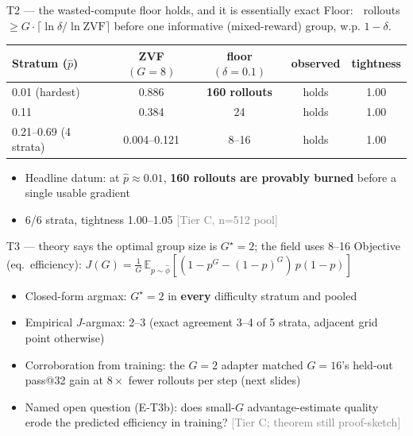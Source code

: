 \documentclass[aspectratio=169,11pt]{beamer}
\newcommand{\tier}[1]{\hfill{\scriptsize\textcolor{gray}{[#1]}}}
\begin{document}
\begin{frame}{T2 --- the wasted-compute floor holds, and it is essentially exact}
  Floor: $\;$ rollouts $\ge G\cdot\lceil \ln\delta / \ln \mathrm{ZVF} \rceil$
  before one informative (mixed-reward) group, w.p. $1-\delta$.
  \vspace{4pt}
  \centering
  \begin{tabular}{@{}lcccc@{}}
    \toprule
    Stratum ($\hat p$) & ZVF$(G{=}8)$ & floor $(\delta{=}0.1)$ & observed & tightness \\
    \midrule
    0.01 (hardest) & 0.886 & \textbf{160 rollouts} & holds & 1.00 \\
    0.11 & 0.384 & 24 & holds & 1.00 \\
    0.21--0.69 (4 strata) & 0.004--0.121 & 8--16 & holds & 1.00 \\
    \bottomrule
  \end{tabular}
  \vspace{6pt}
  \begin{itemize}
    \item Headline datum: at $\hat p \approx 0.01$, \textbf{160 rollouts are
          provably burned} before a single usable gradient
    \item 6/6 strata, tightness 1.00--1.05 \tier{Tier C, n=512 pool}
  \end{itemize}
\end{frame}

\begin{frame}{T3 --- theory says the optimal group size is $G^\star = 2$;
  the field uses 8--16}
  Objective (eq.~efficiency): $J(G)=\frac{1}{G}\,
  \mathbb{E}_{p\sim\hat\phi}[(1-p^G-(1-p)^G)\,p(1-p)]$
  \vspace{4pt}
  \begin{itemize}
    \item Closed-form argmax: $G^\star=2$ in \textbf{every} difficulty stratum
          and pooled
    \item Empirical $J$-argmax: 2--3 (exact agreement 3--4 of 5 strata,
          adjacent grid point otherwise)
    \item Corroboration from training: the $G{=}2$ adapter matched
          $G{=}16$'s held-out pass@32 gain at $8\times$ fewer
          rollouts per step (next slides)
    \item Named open question (E-T3b): does small-$G$ advantage-estimate
          quality erode the predicted efficiency in training?
          \tier{Tier C; theorem still proof-sketch}
  \end{itemize}
\end{frame}
\end{document}
